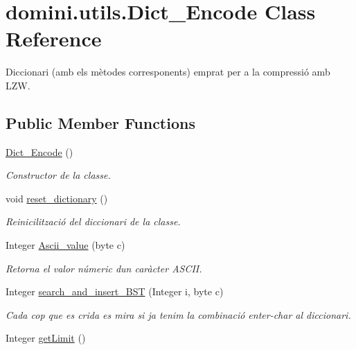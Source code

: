\hypertarget{classdomini_1_1utils_1_1Dict__Encode}{}\section{domini.\+utils.\+Dict\+\_\+\+Encode Class Reference}
\label{classdomini_1_1utils_1_1Dict__Encode}


Diccionari (amb els mètodes corresponents) emprat per a la compressió amb L\+ZW.  


\subsection*{Public Member Functions}
\begin{DoxyCompactItemize}
\item 
\hyperlink{classdomini_1_1utils_1_1Dict__Encode_aa16372a031311494fdcae13d1a9b48c3}{Dict\+\_\+\+Encode} ()
\begin{DoxyCompactList}\small\item\em Constructor de la classe. \end{DoxyCompactList}\item 
void \hyperlink{classdomini_1_1utils_1_1Dict__Encode_a6c3016286b3bb242d12799f8e7ebb585}{reset\+\_\+dictionary} ()
\begin{DoxyCompactList}\small\item\em Reinicilització del diccionari de la classe. \end{DoxyCompactList}\item 
Integer \hyperlink{classdomini_1_1utils_1_1Dict__Encode_a12e23ecdd9b0078cb6e56c01126248b9}{Ascii\+\_\+value} (byte c)
\begin{DoxyCompactList}\small\item\em Retorna el valor númeric d\textquotesingle{}un caràcter A\+S\+C\+II. \end{DoxyCompactList}\item 
Integer \hyperlink{classdomini_1_1utils_1_1Dict__Encode_a1bafdca1835da3fa93b900ff0aa720e0}{search\+\_\+and\+\_\+insert\+\_\+\+B\+ST} (Integer i, byte c)
\begin{DoxyCompactList}\small\item\em Cada cop que es crida es mira si ja tenim la combinació enter-\/char al diccionari. \end{DoxyCompactList}\item 
Integer \hyperlink{classdomini_1_1utils_1_1Dict__Encode_a21a05b62b848a7ab9fbdf49a3a6e7edf}{get\+Limit} ()
\end{DoxyCompactItemize}
